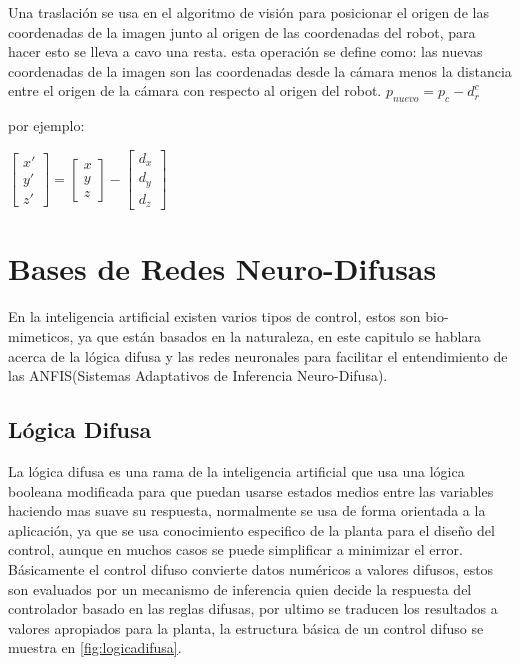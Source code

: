 Una traslación se usa en el algoritmo de visión para posicionar el origen de las coordenadas de la imagen junto al origen de las coordenadas del robot, para hacer esto se lleva a cavo una resta.
esta operación se define como:  las nuevas coordenadas de la imagen son las coordenadas desde la cámara menos la distancia entre el origen de la cámara con respecto al origen del robot.
$p_{nuevo}=p_c-d_{r}^{c}$

por ejemplo:

$\begin{bmatrix}
x'  \\ 
y' \\ 
z'
\end{bmatrix} = 
\begin{bmatrix}
x  \\ 
y \\ 
z
\end{bmatrix}-\begin{bmatrix}
d_x	 \\ 
d_y	 \\ 
d_z	 
\end{bmatrix} $





\chapter{Bases de Redes Neuro-Difusas}\label{basesneurodifusas}
En la inteligencia artificial existen varios tipos de control, estos son bio-mimeticos, ya que están basados en la naturaleza, en este capitulo se hablara acerca de la lógica difusa y las redes neuronales para facilitar el entendimiento de las ANFIS(Sistemas Adaptativos de Inferencia Neuro-Difusa).

\section{Lógica Difusa}

La lógica difusa es una rama de la inteligencia artificial que usa una lógica booleana modificada para que puedan usarse estados medios entre las variables haciendo mas suave su respuesta, normalmente se usa de forma orientada a la aplicación, ya que se usa conocimiento especifico de la planta para el diseño del control, aunque en muchos casos se puede simplificar a minimizar el error. 
Básicamente el control difuso convierte datos numéricos a valores difusos, estos son evaluados por un mecanismo de inferencia quien decide la respuesta del controlador basado en las reglas difusas, por ultimo se traducen los resultados a valores apropiados para la planta, la estructura básica de un control difuso se muestra en \cref{fig:logicadifusa}.

